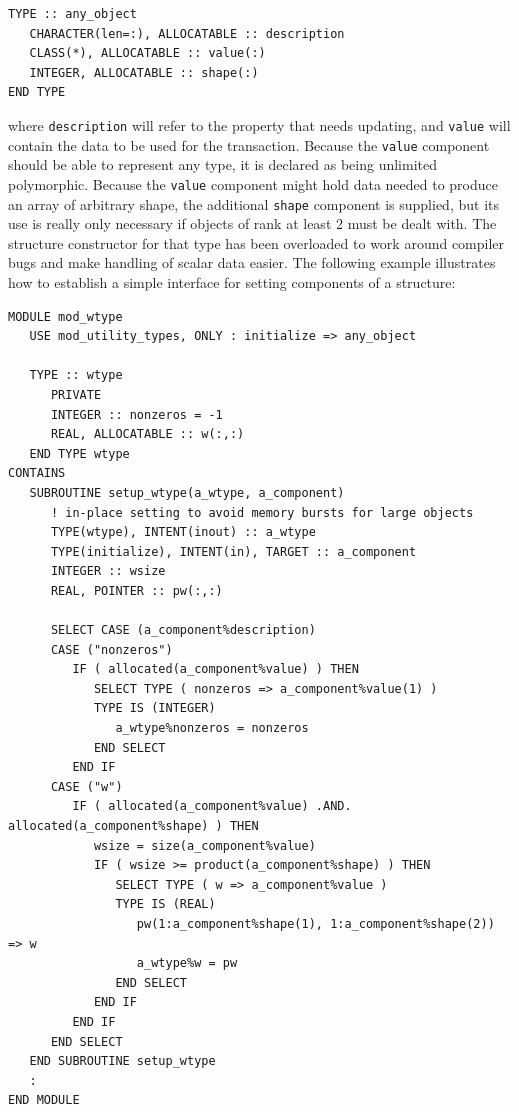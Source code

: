 \documentclass[
  paper=a4,
  ,captions=tableheading
]{scrartcl}
\newcommand{\passthrough}[1]{#1}
\begin{document}
\begin{lstlisting}
TYPE :: any_object
   CHARACTER(len=:), ALLOCATABLE :: description
   CLASS(*), ALLOCATABLE :: value(:)
   INTEGER, ALLOCATABLE :: shape(:)
END TYPE
\end{lstlisting}

where \passthrough{\lstinline!description!} will refer to the property
that needs updating, and \passthrough{\lstinline!value!} will contain
the data to be used for the transaction. Because the
\passthrough{\lstinline!value!} component should be able to represent
any type, it is declared as being unlimited polymorphic. Because the
\passthrough{\lstinline!value!} component might hold data needed to
produce an array of arbitrary shape, the additional
\passthrough{\lstinline!shape!} component is supplied, but its use is
really only necessary if objects of rank at least 2 must be dealt with.
The structure constructor for that type has been overloaded to work
around compiler bugs and make handling of scalar data easier. The
following example illustrates how to establish a simple interface for
setting components of a structure:

\begin{lstlisting}
MODULE mod_wtype
   USE mod_utility_types, ONLY : initialize => any_object

   TYPE :: wtype
      PRIVATE
      INTEGER :: nonzeros = -1
      REAL, ALLOCATABLE :: w(:,:)
   END TYPE wtype
CONTAINS
   SUBROUTINE setup_wtype(a_wtype, a_component)
      ! in-place setting to avoid memory bursts for large objects
      TYPE(wtype), INTENT(inout) :: a_wtype
      TYPE(initialize), INTENT(in), TARGET :: a_component
      INTEGER :: wsize
      REAL, POINTER :: pw(:,:)

      SELECT CASE (a_component%description)
      CASE ("nonzeros")
         IF ( allocated(a_component%value) ) THEN
            SELECT TYPE ( nonzeros => a_component%value(1) )
            TYPE IS (INTEGER)
               a_wtype%nonzeros = nonzeros
            END SELECT
         END IF
      CASE ("w")
         IF ( allocated(a_component%value) .AND. allocated(a_component%shape) ) THEN
            wsize = size(a_component%value)
            IF ( wsize >= product(a_component%shape) ) THEN
               SELECT TYPE ( w => a_component%value )
               TYPE IS (REAL)
                  pw(1:a_component%shape(1), 1:a_component%shape(2)) => w
                  a_wtype%w = pw
               END SELECT
            END IF
         END IF
      END SELECT
   END SUBROUTINE setup_wtype
   :
END MODULE
\end{lstlisting}
\end{document}

